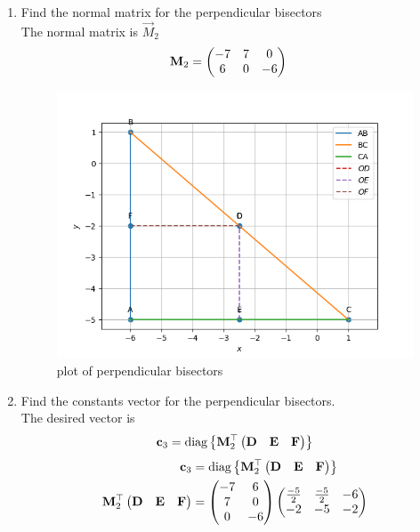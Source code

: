 \documentclass[11pt]{book}
\begin{document}
  
\begin{enumerate}[label=\thesubsection.\arabic*.,ref=\thesubsection.\theenumi]
\item Find the normal matrix for the perpendicular bisectors \\
\solution The normal matrix is $\vec{M}_2$
\begin{align}
       \mathbf{M}_2 &=\begin{pmatrix}-7 & 7 & 0 \\ 6 & 0 & -6\end{pmatrix}
\end{align}
\begin{figure}[H]
    \centering
    \includegraphics{figs/Perpendicular bisector.png}
    \caption{plot of perpendicular bisectors}
    \label{fig:mat_perp1}
\end{figure}
\item Find the constants vector for the perpendicular bisectors. \\
\solution The desired vector is 
\begin{align}
\mathbf{c}_3 = \text{diag}\left\{\mathbf{M}_2^{\top}\begin{pmatrix}\mathbf{D} & \mathbf{E} &\mathbf{F}\end{pmatrix}\right\}
\end{align}
\solution
\begin{align}
\vec{c}_3 &= \text{diag}\cbrak{\vec{M}_2^{\top}\myvec{\vec{D} & \vec{E} &\vec{F}}} \\
\vec{M}_2^{\top}\myvec{\vec{D} & \vec{E} &\vec{F}} &= \myvec{-7&6 \\ 7&0 \\ 0 &-6}\myvec{\frac{-5}{2} & \frac{-5}{2} & -6 \\ -2 & -5 & -2} \\

\end{align}
\end{enumerate}
\end{document}
